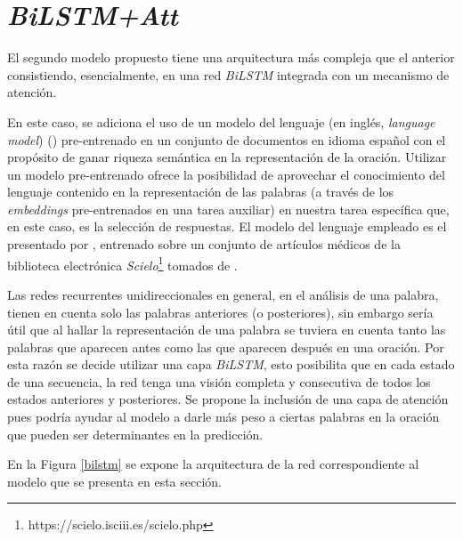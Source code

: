 \section{\textit{BiLSTM+Att}}\label{bilstm_t}

El segundo modelo propuesto tiene una arquitectura más compleja que el anterior consistiendo, esencialmente, en una red \textit{BiLSTM} integrada con un mecanismo de atención.

En este caso, se adiciona el uso de un modelo del lenguaje (en inglés, \textit{language model})  (\cite{mikolov-2016-fastext}) pre-entrenado en un conjunto de documentos en idioma español con el propósito de ganar riqueza semántica en la representación de la oración. Utilizar un modelo pre-entrenado ofrece la posibilidad de aprovechar el conocimiento del lenguaje contenido en la representación de las palabras (a través de los \textit{embeddings} pre-entrenados en una tarea auxiliar) en nuestra tarea específica que, en este caso, es la selección de respuestas. El modelo del lenguaje empleado es el presentado por \cite{mikolov-2016-fastext}, entrenado sobre un conjunto de artículos médicos de la biblioteca electrónica \textit{Scielo}\footnote{https://scielo.isciii.es/scielo.php} tomados de \cite{2019-medical-fastext}.

Las redes recurrentes unidireccionales en general, en el análisis de una palabra, tienen en cuenta solo las palabras anteriores (o posteriores), sin embargo sería útil que al hallar la representación de una palabra se tuviera en cuenta tanto las palabras que aparecen antes como las que aparecen después en una oración. Por esta razón se decide utilizar una capa \textit{BiLSTM}, esto posibilita que en cada estado de una secuencia, la red tenga una visión completa y consecutiva de todos los estados anteriores y posteriores. Se propone la inclusión de una capa de atención pues podría ayudar al modelo a darle más peso a ciertas palabras en la oración que pueden ser determinantes en la predicción.

En la Figura \ref{bilstm} se expone la arquitectura de la red correspondiente al modelo que se presenta en esta sección. 

